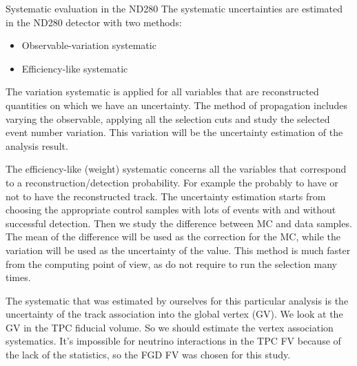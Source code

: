 \documentclass[../main.tex]{subfiles}
\begin{document}
\begin{bclogo}[couleur=blue!2, arrondi=0.1, logo=\bcinfo, nobreak=true]{Systematic evaluation in the ND280}
    The systematic uncertainties are estimated in the ND280 detector with two methods:
    \begin{itemize}
        \item Observable-variation systematic
        \item Efficiency-like systematic
    \end{itemize}

    The variation systematic is applied for all variables that are reconstructed quantities on which we have an uncertainty. The method of propagation includes varying the observable, applying all the selection cuts and study the selected event number variation. This variation will be the uncertainty estimation of the analysis result.

    The efficiency-like (weight) systematic concerns all the variables that correspond to a reconstruction/detection probability. For example the probably to have or not to have the reconstructed track. The uncertainty estimation starts from choosing the appropriate control samples with lots of events with and without successful detection. Then we study the difference between MC and data samples. The mean of the difference will be used as the correction for the MC, while the variation will be used as the uncertainty of the value. This method is much faster from the computing point of view, as do not require to run the selection many times.
\end{bclogo}


The systematic that was estimated by ourselves for this particular analysis is the uncertainty of the track association into the global vertex (GV). We look at the GV in the TPC fiducial volume. So we should estimate the vertex association systematics. It's impossible for neutrino interactions in the TPC FV because of the lack of the statistics, so the FGD FV was chosen for this study.
\end{document}
